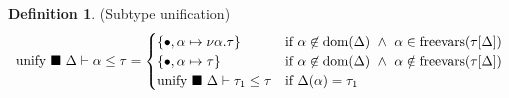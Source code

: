 \documentclass[manuscript]{acmart}
\theoremstyle{definition}
\newtheorem{definition}{Definition}[section]
\begin{document}
\begin{definition}(Subtype unification)
\[
  \begin{array}{l @{} l}

    \text{unify } \blacksquare\ \Delta \vdash \alpha \leq \tau	
    &{} =
    \begin{cases}  
      \{ \bullet,\alpha \mapsto \nu\alpha.\tau \}
      & \text{if } 
      \alpha \not\in \text{dom}(\Delta) \ \wedge\
      \alpha \in \text{freevars}(\tau[\Delta])
      \\
      \{ \bullet,\alpha \mapsto \tau \}
      & \text{if } 
      \alpha \not\in \text{dom}(\Delta) \ \wedge\
      \alpha \notin \text{freevars}(\tau[\Delta])
      \\
      \text{unify } \blacksquare\ \Delta \vdash \tau_1 \leq \tau
      &\text{if }
      \Delta(\alpha) = \tau_1
    \end{cases}
    \\


\end{array}\]
\end{definition}
\end{document}
